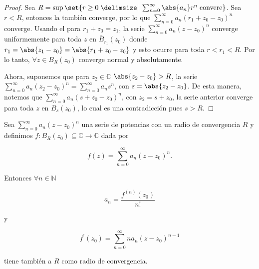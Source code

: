 \documentclass[../main.tex]{subfiles}
\begin{document}
\begin{proof}
    Sea \(R = \sup\set{r \geq 0 \given \sum_{n = 0}^{\infty}\abs{a_{n}}r^{n}\;
    \text{convere}}\). Sea \(r < R\), entonces la también converge, por lo que \(\sum_{n
    = 0}^{\infty}a_{n}(r_{1} + z_{0} - z_{0}) ^{n}\) converge.
    Usando el  para \(r_{1} +
    z_{0} = z_{1}\), la serie \(\sum_{n = 0}^{\infty}a_{n}(z - z_{0})^{n}\) converge
    uniformemente para toda \(z\) en \(\bar{B}_{r_{1}}(z_{0})\) donde \(r_{1} =
    \abs{z_{1} - z_{0}} = \abs{r_{1} + z_{0} - z_{0}}\) y esto ocurre para toda \(r <
    r_{1} < R\). Por lo tanto, \(\forall z\in B_{R}(z_{0})\) converge normal y
    absolutamente.

    Ahora, suponemos que para \(z_{2}\in \mathbb{C}\) \(\abs{z_{2} - z_{0}} >
    R\), la serie
    \(\sum_{n = 0}^{\infty}a_{n}(z_{2} - z_{0})^{n} = \sum_{n =
    0}^{\infty}a_{n}s^{n}\), con
    \(s = \abs{z_{2} - z_{0}}\). De esta manera, notemos que \(\sum_{n =
        0}^{\infty}a_{n}(s
    + z_{0} - z_{0})^{n}\), con \(z_{2} = s + z_{0}\), la serie anterior
    converge para toda
    \(z\) en \(B_{s}(z_{0})\), lo cual es una contradicción pues \(s > R\).
\end{proof}


\begin{theorem}
    Sea \(\sum_{n = 0}^{\infty}a_{n}(z - z_{0})^{n}\) una serie de potencias con un
    radio de convergencia \(R\) y definimos \(f \colon B_{R}(z_{0}) \subseteq \mathbb{C}
    \to \mathbb{C}\) dada por

    \begin{equation*}
        f(z) = \sum_{n = 0}^{\infty}a_{n}(z - z_{0})^{n}.
    \end{equation*}

    Entonces \(\forall n\in \mathbb{N}\)

    \begin{equation*}
        a_{n} = \dfrac{f^{(n)}(z_{0})}{n!}
    \end{equation*}

    y

    \begin{equation*}
        f^{\prime}(z_{0}) = \sum_{n = 0}^{\infty}n a_{n}(z - z_{0})^{n - 1}
    \end{equation*}

    tiene también a \(R\) como radio de convergencia.
\end{theorem}
\end{document}
